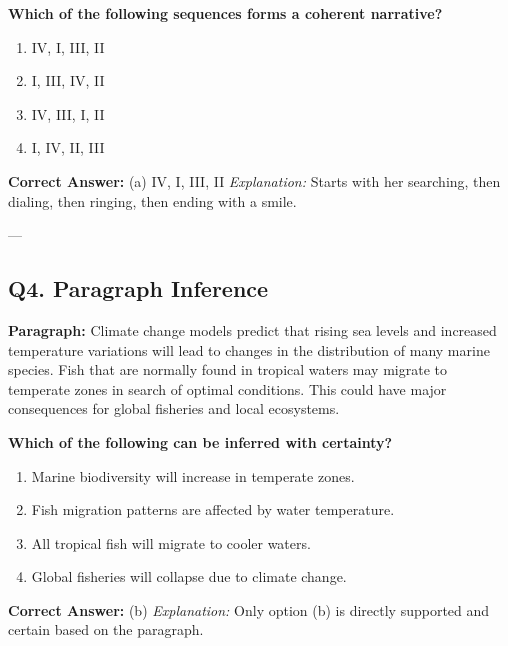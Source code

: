 \textbf{Which of the following sequences forms a coherent narrative?}

\begin{enumerate}[label=(\alph*)]
    \item IV, I, III, II
    \item I, III, IV, II
    \item IV, III, I, II
    \item I, IV, II, III
\end{enumerate}

\textbf{Correct Answer:} (a) IV, I, III, II  
\textit{Explanation:} Starts with her searching, then dialing, then ringing, then ending with a smile.

---

\subsection*{Q4. Paragraph Inference}
\textbf{Paragraph:}  
Climate change models predict that rising sea levels and increased temperature variations will lead to changes in the distribution of many marine species. Fish that are normally found in tropical waters may migrate to temperate zones in search of optimal conditions. This could have major consequences for global fisheries and local ecosystems.

\textbf{Which of the following can be inferred with certainty?}

\begin{enumerate}[label=(\alph*)]
    \item Marine biodiversity will increase in temperate zones.
    \item Fish migration patterns are affected by water temperature.
    \item All tropical fish will migrate to cooler waters.
    \item Global fisheries will collapse due to climate change.
\end{enumerate}

\textbf{Correct Answer:} (b)  
\textit{Explanation:} Only option (b) is directly supported and certain based on the paragraph.

